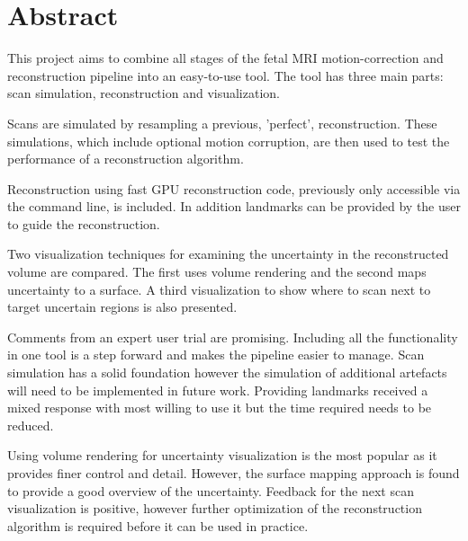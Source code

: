 
\chapter*{Abstract}
This project aims to combine all stages of the fetal MRI motion-correction and reconstruction pipeline into an easy-to-use tool. The tool has three main parts: scan simulation, reconstruction and visualization.

Scans are simulated by resampling a previous, 'perfect', reconstruction. These simulations, which include optional motion corruption, are then used to test the performance of a reconstruction algorithm.

Reconstruction using fast GPU reconstruction code, previously only accessible via the command line, is included. In addition landmarks can be provided by the user to guide the reconstruction.

Two visualization techniques for examining the uncertainty in the reconstructed volume are compared. The first uses volume rendering and the second maps uncertainty to a surface. A third visualization to show where to scan next to target uncertain regions is also presented.

Comments from an expert user trial are promising. Including all the functionality in one tool is a step forward and makes the pipeline easier to manage. Scan simulation has a solid foundation however the simulation of additional artefacts will need to be implemented in future work. Providing landmarks received a mixed response with most willing to use it but the time required needs to be reduced.

Using volume rendering for uncertainty visualization is the most popular as it provides finer control and detail. However, the surface mapping approach is found to provide a good overview of the uncertainty. Feedback for the next scan visualization is positive, however further optimization of the reconstruction algorithm is required before it can be used in practice.